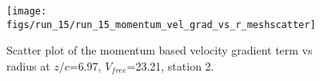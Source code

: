 \begin{figure}[H]
\centering
\texttt{[image: figs/run\_15/run\_15\_momentum\_vel\_grad\_vs\_r\_meshscatter]}
\caption{Scatter plot of the momentum based velocity gradient term vs radius at $z/c$=6.97, $V_{free}$=23.21, station 2.}
\label{fig:run_15_momentum_vel_grad_vs_r_meshscatter}
\end{figure}


